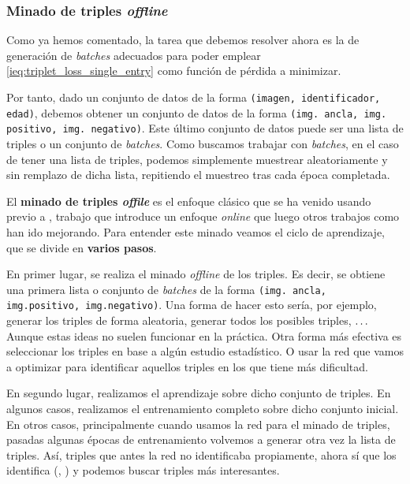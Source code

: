 \subsubsection{Minado de triples \textit{offline}} \label{isubs:enfoque_offline_minado_triples}

Como ya hemos comentado, la tarea que debemos resolver ahora es la de generación de \textit{batches} adecuados para poder emplear \eqref{ieq:triplet_loss_single_entry} como función de pérdida a minimizar.

Por tanto, dado un conjunto de datos de la forma \lstinline{(imagen, identificador, edad)}, debemos obtener un conjunto de datos de la forma \lstinline{(img. ancla, img. positivo, img. negativo)}. Este último conjunto de datos puede ser una lista de triples o un conjunto de \textit{batches}. Como buscamos trabajar con \textit{batches}, en el caso de tener una lista de triples, podemos simplemente muestrear aleatoriamente y sin remplazo de dicha lista, repitiendo el muestreo tras cada época completada.

El \textbf{minado de triples \textit{offile}} es el enfoque clásico que se ha venido usando previo a \cite{informatica:facenet}, trabajo que introduce un enfoque \textit{online} que luego otros trabajos como \cite{informatica:principal} han ido mejorando. Para entender este minado veamos el ciclo de aprendizaje, que se divide en \textbf{varios pasos}.

En primer lugar, se realiza el minado \textit{offline} de los triples. Es decir, se obtiene una primera lista o conjunto de \textit{batches} de la forma \lstinline{(img. ancla, img.positivo, img.negativo)}. Una forma de hacer esto sería, por ejemplo, generar los triples de forma aleatoria, generar todos los posibles triples, $\ldots\ \ $ Aunque estas ideas no suelen funcionar en la práctica. Otra forma más efectiva es seleccionar los triples en base a algún estudio estadístico. O usar la red que vamos a optimizar para identificar aquellos triples en los que tiene más dificultad.

En segundo lugar, realizamos el aprendizaje sobre dicho conjunto de triples. En algunos casos, realizamos el entrenamiento completo sobre dicho conjunto inicial. En otros casos, principalmente cuando usamos la red para el minado de triples, pasadas algunas épocas de entrenamiento volvemos a generar otra vez la lista de triples. Así, triples que antes la red no identificaba propiamente, ahora sí que los identifica (, \cite{informatica:facenet}) y podemos buscar triples más interesantes.

